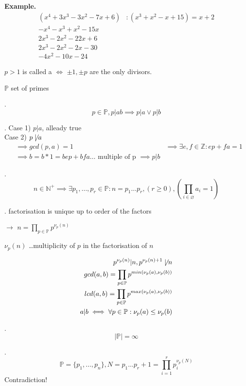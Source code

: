 \textbf{Example.}
\begin{align*}
  (x^4 + 3x^3 - 3x^2 - 7x + 6) &: ( x^3 + x^2 - x + 15) = x+2 \\
  -x^4 - x^3 + x^2 - 15 x \\
  \hline 
    2x^3 - 2x^2 - 22 x + 6 \\
    2x^3 - 2x^2 - 2 x -30 \\ 
    \hline
      -4x^2 - 10 x - 24
\end{align*}

\begin{definition}
$p>1$ is called a  $\iff$ $\pm 1, \pm p$ are the only divisors.

$\mathbb{P}$ set of primes
\end{definition}

\Theorem.
\[
  p\in \mathbb{P}, p|ab \implies p|a \vee p|b
\]

\Proof.
Case 1) $p|a$, alleady true\\
Case 2) $p \not\mid a$
\begin{align*}
  &\implies gcd(p,a) = 1 
  &\implies \exists e,f \in \mathbb{Z}: ep + fa = 1 \\
  &\implies b = b*1 = b e p + b f a \ldots \text{ multiple of p } \implies p|b
\end{align*}

\Theorem.
\[
  n \in \mathbb{N}^{+} \implies \exists p_1, \ldots ,p_r \in \mathbb{P}: n = p_1 \ldots p_r, (r \geq 0), (\prod_{i\in \varnothing} a_i = 1)
\]

\Remark.
factorisation is unique up to order of the factors

$\rightarrow$ $n = \prod_{p \in \mathbb{P}} p^{\nu_p(n)}$

$\nu_p(n)$ \ldots multiplicity of $p$ in the factorisation of $n$

\begin{align*}
 p^{\nu_p(n)} | n, p^{\nu_p(n)+1} \not\mid n\\
 gcd(a,b) = \prod_{p \in \mathbb{P}} p ^{min(\nu_p(a), \nu_p(b))} \\
 lcd(a,b) = \prod_{p \in \mathbb{P}} p ^{max(\nu_p(a), \nu_p(b))} \\
 a|b \iff \forall p \in \mathbb{P} : \nu_p(a) \leq \nu_p(b)
\end{align*}

\Theorem.
\[
  | \mathbb{P} | = \infty
\]

\Proof.
\[
  \mathbb{P} = \{p_1, \ldots , p_n\}, N = p_1 \ldots p_r + 1 = \prod_{i=1}^r p_i^{\nu_p(N)}
\]
Contradiction!

